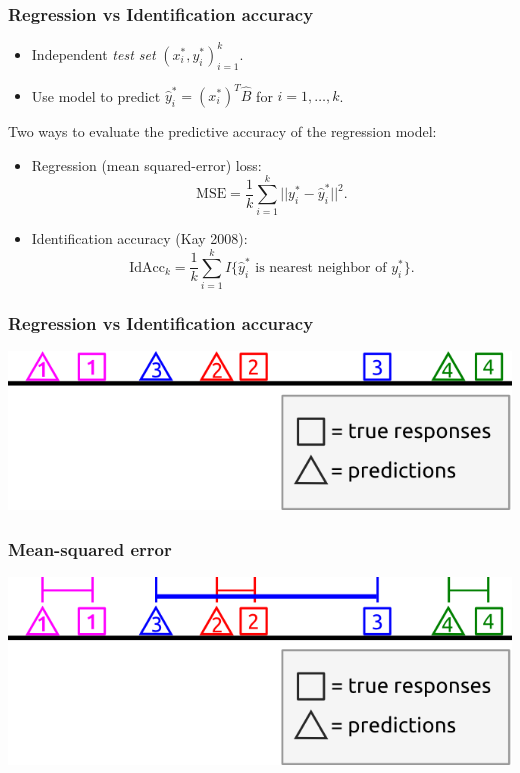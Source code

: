 \documentclass{beamer}
\begin{document}
\begin{frame}
\frametitle{Regression vs Identification accuracy}
\begin{itemize}
\item Independent \emph{test set} $(x_i^*, y_i^*)_{i=1}^k$. 
\item Use model to predict $\hat{y}_i^* = (x_i^*)^T \hat{B}$ for $i = 1,\hdots, k$.
\end{itemize}
Two ways to evaluate the predictive accuracy of the regression model:
\begin{itemize}
\item Regression (mean squared-error) loss:
\[
\text{MSE} = \frac{1}{k} \sum_{i=1}^k ||y_i^* - \hat{y}_i^*||^2.
\]
\item Identification accuracy (Kay 2008):
\[
\text{IdAcc}_k = \frac{1}{k} \sum_{i=1}^k I\{\hat{y}_i^* \text{ is nearest neighbor of }y_i^*\}.
\]
\end{itemize}
\end{frame}

\begin{frame}
\frametitle{Regression vs Identification accuracy}
\begin{center}
\includegraphics[scale = 0.5]{../diagram/idloss1.png}
\end{center}
\end{frame}

\begin{frame}
\frametitle{Mean-squared error}
\begin{center}
\includegraphics[scale = 0.5]{../diagram/idloss2a.png}
\end{center}
\end{frame}
\end{document}

